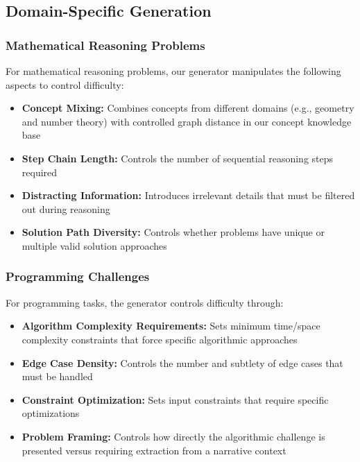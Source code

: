 \subsection{Domain-Specific Generation}

\subsubsection{Mathematical Reasoning Problems}

For mathematical reasoning problems, our generator manipulates the following aspects to control difficulty:

\begin{itemize}
    \item \textbf{Concept Mixing:} Combines concepts from different domains (e.g., geometry and number theory) with controlled graph distance in our concept knowledge base
    \item \textbf{Step Chain Length:} Controls the number of sequential reasoning steps required
    \item \textbf{Distracting Information:} Introduces irrelevant details that must be filtered out during reasoning
    \item \textbf{Solution Path Diversity:} Controls whether problems have unique or multiple valid solution approaches
\end{itemize}

\subsubsection{Programming Challenges}

For programming tasks, the generator controls difficulty through:

\begin{itemize}
    \item \textbf{Algorithm Complexity Requirements:} Sets minimum time/space complexity constraints that force specific algorithmic approaches
    \item \textbf{Edge Case Density:} Controls the number and subtlety of edge cases that must be handled
    \item \textbf{Constraint Optimization:} Sets input constraints that require specific optimizations
    \item \textbf{Problem Framing:} Controls how directly the algorithmic challenge is presented versus requiring extraction from a narrative context
\end{itemize}

